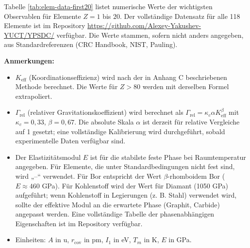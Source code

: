 \documentclass[12pt,a4paper]{article}
\newcommand{\Keff}{K_{\mathrm{eff}}}
\begin{document}
	Tabelle \ref{tab:elem-data-first20} listet numerische Werte der wichtigsten Observablen für Elemente \(Z=1\) bis \(20\). Der vollständige Datensatz für alle 118 Elemente ist im Repository \url{https://github.com/Alexey-Yakushev-YUCT/YPSDC/} verfügbar. Die Werte stammen, sofern nicht anders angegeben, aus Standardreferenzen (CRC Handbook, NIST, Pauling).
	
	\textbf{Anmerkungen:}
	\begin{itemize}
		\item \(\Keff\) (Koordinationseffizienz) wird nach der in Anhang C beschriebenen Methode berechnet. Die Werte für \(Z>80\) werden mit derselben Formel extrapoliert.
		\item \(\Gamma_{\text{rel}}\) (relativer Gravitationskoeffizient) wird berechnet als \(\Gamma_{\text{rel}} = \kappa_c \alpha \Keff^{\beta}\) mit \(\kappa_c=0,33\), \(\beta=0,67\). Die absolute Skala \(\alpha\) ist derzeit für relative Vergleiche auf 1 gesetzt; eine vollständige Kalibrierung wird durchgeführt, sobald experimentelle Daten verfügbar sind.
		\item Der Elastizitätsmodul \(E\) ist für die stabilste feste Phase bei Raumtemperatur angegeben. Für Elemente, die unter Standardbedingungen nicht fest sind, wird „–“ verwendet. Für Bor entspricht der Wert \(\beta\)-rhomboidem Bor (\(E \approx 460\) GPa). Für Kohlenstoff wird der Wert für Diamant (1050 GPa) aufgeführt; wenn Kohlenstoff in Legierungen (z. B. Stahl) verwendet wird, sollte der effektive Modul an die erwartete Phase (Graphit, Carbide) angepasst werden. Eine vollständige Tabelle der phasenabhängigen Eigenschaften ist im Repository verfügbar.
		\item Einheiten: \(A\) in u, \(r_{\text{cov}}\) in pm, \(I_1\) in eV, \(T_m\) in K, \(E\) in GPa.
	\end{itemize}
	
\end{document}
